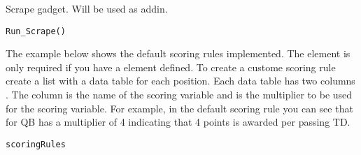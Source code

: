\documentclass[a4paper]{book}
\begin{document}
%
\begin{Description}\relax
Scrape gadget. Will be used as addin.
\end{Description}
%
\begin{Usage}
\begin{verbatim}
Run_Scrape()
\end{verbatim}
\end{Usage}
%
\begin{Description}\relax
The example below shows the default scoring rules implemented. The 
element is only required if you have a  element defined. To create a
custome scoring rule create a list with a data table for each position. Each
data table has two columns . The  column
is the name of the scoring variable and  is the multiplier
to be used for the scoring variable. For example, in the default scoring rule
you can see that  for QB has a multiplier of 4 indicating that
4 points is awarded per passing TD.
\end{Description}
%
\begin{Usage}
\begin{verbatim}
scoringRules
\end{verbatim}
\end{Usage}
%
\end{document}
